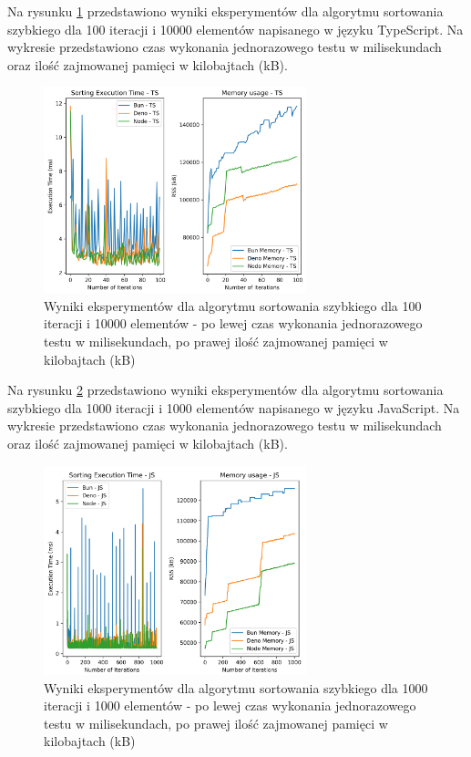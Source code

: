 Na rysunku \ref{fig:quick_sorting_e2_ts} przedstawiono wyniki eksperymentów dla algorytmu sortowania szybkiego dla 100 iteracji i 10000 elementów napisanego w języku TypeScript. Na wykresie przedstawiono czas wykonania jednorazowego testu w milisekundach oraz ilość zajmowanej pamięci w kilobajtach (kB).

\begin{figure}[H]
  \centering
  \includegraphics[width=0.68\textwidth]{Figures/sorting/sorting_quick_100_10000_ts.png}
  \caption{Wyniki eksperymentów dla algorytmu sortowania szybkiego dla 100 iteracji i 10000 elementów - po lewej czas wykonania jednorazowego testu w milisekundach, po prawej ilość zajmowanej pamięci w kilobajtach (kB)}
  \label{fig:quick_sorting_e2_ts}
\end{figure}

Na rysunku \ref{fig:quick_sorting_e3} przedstawiono wyniki eksperymentów dla algorytmu sortowania szybkiego dla 1000 iteracji i 1000 elementów napisanego w języku JavaScript. Na wykresie przedstawiono czas wykonania jednorazowego testu w milisekundach oraz ilość zajmowanej pamięci w kilobajtach (kB).

\begin{figure}[H]
  \centering
  \includegraphics[width=0.68\textwidth]{Figures/sorting/sorting_quick_1000_1000_js.png}
  \caption{Wyniki eksperymentów dla algorytmu sortowania szybkiego dla 1000 iteracji i 1000 elementów - po lewej czas wykonania jednorazowego testu w milisekundach, po prawej ilość zajmowanej pamięci w kilobajtach (kB)}
  \label{fig:quick_sorting_e3}
\end{figure}

